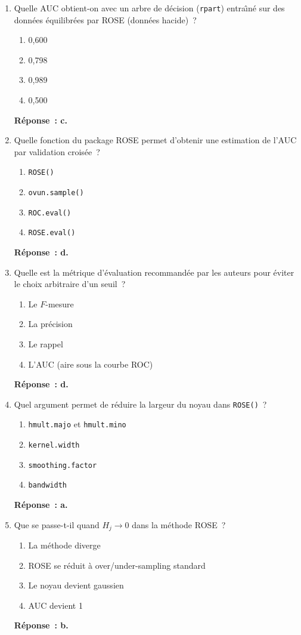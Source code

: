 \documentclass[a4paper,11pt]{article}
\theoremstyle{definition}
\begin{document}
\begin{enumerate}
  \item Quelle AUC obtient-on avec un arbre de d\'ecision
    (\texttt{rpart}) entra\^\i n\'e sur des donn\'ees \'equilibr\'ees
    par ROSE (donn\'ees hacide)~?
    \begin{enumerate}
      \item 0,600
      \item 0,798
      \item 0,989
      \item 0,500
    \end{enumerate}
    \textbf{R\'eponse~: c.}

  \item Quelle fonction du package ROSE permet d'obtenir une
    estimation de l'AUC par validation crois\'ee~?
    \begin{enumerate}
      \item \texttt{ROSE()}
      \item \texttt{ovun.sample()}
      \item \texttt{ROC.eval()}
      \item \texttt{ROSE.eval()}
    \end{enumerate}
    \textbf{R\'eponse~: d.}

  \item Quelle est la m\'etrique d'\'evaluation recommand\'ee par
    les auteurs pour \'eviter le choix arbitraire d'un
    seuil~?
    \begin{enumerate}
      \item Le $F$-mesure
      \item La pr\'ecision
      \item Le rappel
      \item L'AUC (aire sous la courbe ROC)
    \end{enumerate}
    \textbf{R\'eponse~: d.}

  \item Quel argument permet de r\'eduire la largeur du noyau dans
    \texttt{ROSE()}~?
    \begin{enumerate}
      \item \texttt{hmult.majo} et \texttt{hmult.mino}
      \item \texttt{kernel.width}
      \item \texttt{smoothing.factor}
      \item \texttt{bandwidth}
    \end{enumerate}
    \textbf{R\'eponse~: a.}

  \item Que se passe-t-il quand $H_j \to 0$ dans la m\'ethode
    ROSE~?
    \begin{enumerate}
      \item La m\'ethode diverge
      \item ROSE se r\'eduit \`a over/under-sampling standard
      \item Le noyau devient gaussien
      \item AUC devient 1
    \end{enumerate}
    \textbf{R\'eponse~: b.}


\end{enumerate}
\end{document}

